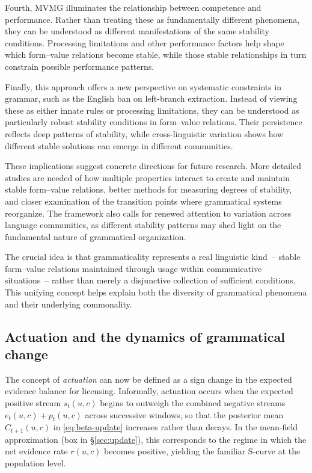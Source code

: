 \documentclass[12pt,letterpaper]{article}
\begin{document}
Fourth, MVMG illuminates the relationship between competence and performance. Rather than treating these as fundamentally different phenomena, they can be understood as different manifestations of the same stability conditions. Processing limitations and other performance factors help shape which form--value relations become stable, while those stable relationships in turn constrain possible performance patterns.

Finally, this approach offers a new perspective on systematic constraints in grammar, such as the English ban on left-branch extraction. Instead of viewing these as either innate rules or processing limitations, they can be understood as particularly robust stability conditions in form--value relations. Their persistence reflects deep patterns of stability, while cross-linguistic variation shows how different stable solutions can emerge in different communities.

These implications suggest concrete directions for future research. More detailed studies are needed of how multiple properties interact to create and maintain stable form--value relations, better methods for measuring degrees of stability, and closer examination of the transition points where grammatical systems reorganize. The framework also calls for renewed attention to variation across language communities, as different stability patterns may shed light on the fundamental nature of grammatical organization.

The crucial idea is that grammaticality represents a real linguistic kind~-- stable form--value relations maintained through usage within communicative situations~-- rather than merely a disjunctive collection of sufficient conditions. This unifying concept helps explain both the diversity of grammatical phenomena and their underlying commonality.

\subsection{Actuation and the dynamics of grammatical change}

The concept of \textit{actuation} can now be defined as a sign change in the expected evidence balance for licensing. Informally, actuation occurs when the expected positive stream $s_t(u,c)$ begins to outweigh the combined negative streams $e_t(u,c)+p_t(u,c)$ across successive windows, so that the posterior mean $C_{t+1}(u,c)$ in \eqref{eq:beta-update} increases rather than decays. In the mean-field approximation (box in \S\ref{sec:update}), this corresponds to the regime in which the net evidence rate $r(u,c)$ becomes positive, yielding the familiar S-curve at the population level.
\end{document}
